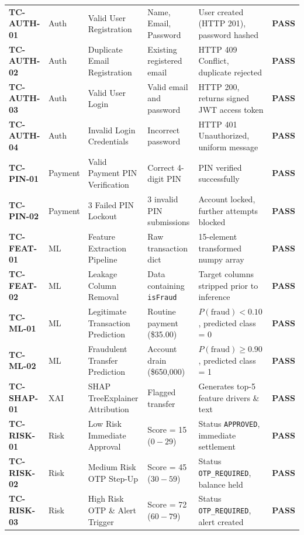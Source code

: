 \begin{longtable}{lp{2.4cm}p{3.2cm}p{3.0cm}p{3.2cm}c}
\textbf{TC-AUTH-01} & Auth & Valid User Registration & Name, Email, Password & User created (HTTP 201), password hashed & \textbf{PASS} \\
\addlinespace
\textbf{TC-AUTH-02} & Auth & Duplicate Email Registration & Existing registered email & HTTP 409 Conflict, duplicate rejected & \textbf{PASS} \\
\addlinespace
\textbf{TC-AUTH-03} & Auth & Valid User Login & Valid email and password & HTTP 200, returns signed JWT access token & \textbf{PASS} \\
\addlinespace
\textbf{TC-AUTH-04} & Auth & Invalid Login Credentials & Incorrect password & HTTP 401 Unauthorized, uniform message & \textbf{PASS} \\
\addlinespace
\textbf{TC-PIN-01} & Payment & Valid Payment PIN Verification & Correct 4-digit PIN & PIN verified successfully & \textbf{PASS} \\
\addlinespace
\textbf{TC-PIN-02} & Payment & 3 Failed PIN Lockout & 3 invalid PIN submissions & Account locked, further attempts blocked & \textbf{PASS} \\
\addlinespace
\textbf{TC-FEAT-01} & ML & Feature Extraction Pipeline & Raw transaction dict & 15-element transformed numpy array & \textbf{PASS} \\
\addlinespace
\textbf{TC-FEAT-02} & ML & Leakage Column Removal & Data containing \texttt{isFraud} & Target columns stripped prior to inference & \textbf{PASS} \\
\addlinespace
\textbf{TC-ML-01} & ML & Legitimate Transaction Prediction & Routine payment (\$35.00) & $P(\text{fraud}) < 0.10$, predicted class = 0 & \textbf{PASS} \\
\addlinespace
\textbf{TC-ML-02} & ML & Fraudulent Transfer Prediction & Account drain (\$650,000) & $P(\text{fraud}) \ge 0.90$, predicted class = 1 & \textbf{PASS} \\
\addlinespace
\textbf{TC-SHAP-01} & XAI & SHAP TreeExplainer Attribution & Flagged transfer & Generates top-5 feature drivers \& text & \textbf{PASS} \\
\addlinespace
\textbf{TC-RISK-01} & Risk & Low Risk Immediate Approval & Score = 15 ($0-29$) & Status \texttt{APPROVED}, immediate settlement & \textbf{PASS} \\
\addlinespace
\textbf{TC-RISK-02} & Risk & Medium Risk OTP Step-Up & Score = 45 ($30-59$) & Status \texttt{OTP\_REQUIRED}, balance held & \textbf{PASS} \\
\addlinespace
\textbf{TC-RISK-03} & Risk & High Risk OTP \& Alert Trigger & Score = 72 ($60-79$) & Status \texttt{OTP\_REQUIRED}, alert created & \textbf{PASS} \\

\end{longtable}

